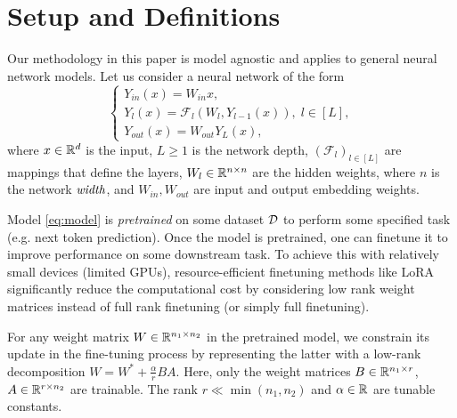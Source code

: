 \section{Setup and Definitions}
Our methodology in this paper is model agnostic and applies to general neural network models. Let us consider a neural network of the form
\begin{equation}\label{eq:model}
\begin{cases}
Y_{in}(x) = W_{in}x,\\
Y_l(x) = \mathcal{F}_l(W_l,Y_{l-1}(x)), \; l\in[L],\\
Y_{out}(x) = W_{out} Y_L(x), 
\end{cases}
\end{equation}
where $x\in\mathbb{R}^{d}$ is the input, $L\geq1$ is the network depth,
$(\mathcal{F}_{l})_{l\in[L]}$ are mappings that define the layers, $W_{l}\in\mathbb{R}^{n\times n}$ are the hidden weights, where $n$ is the
network $\emph{width}$, and $W_{in}, W_{out}$ are input and output embedding weights. 

Model \eqref{eq:model} is \emph{pretrained} on some dataset $\mathcal{D}$ to perform some specified task (e.g. next token prediction). 
Once the model is pretrained, one can finetune it to improve performance on some downstream task. To achieve this with relatively small devices (limited GPUs), resource-efficient finetuning methods like LoRA significantly reduce the computational cost by considering low rank weight matrices instead of full rank finetuning (or simply full finetuning). 
\begin{defn}\label{def:lora}
For any weight matrix $W\in\mathbb{R}^{n_{1}\times n_{2}}$ in the pretrained
model, we constrain its update in the fine-tuning process by representing
the latter with a low-rank decomposition $W=W^{*}+\frac{\alpha}{r}BA$.
Here, only the weight matrices $B\in\mathbb{R}^{n_{1}\times r}$,
$A\in\mathbb{R}^{r\times n_{2}}$ are trainable. The rank $r\ll\min(n_{1},n_{2})$ and $\alpha\in\mathbb{R}$
are tunable constants. 
\end{defn}

